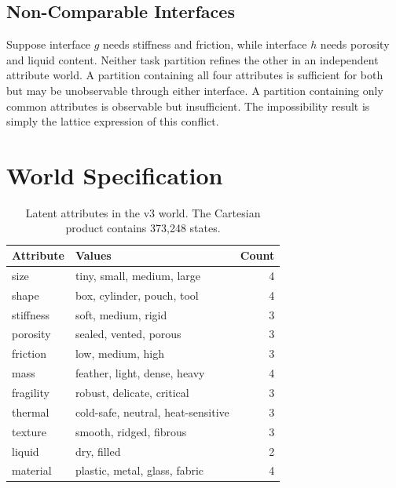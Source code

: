 \documentclass{article}
\begin{document}
\subsection{Non-Comparable Interfaces}

Suppose interface $g$ needs stiffness and friction, while interface $h$ needs porosity and liquid content.
Neither task partition refines the other in an independent attribute world.
A partition containing all four attributes is sufficient for both but may be unobservable through either interface.
A partition containing only common attributes is observable but insufficient.
The impossibility result is simply the lattice expression of this conflict.

\section{World Specification}

\begin{table}[h]
\centering
\caption{Latent attributes in the v3 world. The Cartesian product contains 373,248 states.}
\begin{tabular}{llr}
\toprule
Attribute & Values & Count \\
\midrule
size & tiny, small, medium, large & 4 \\
shape & box, cylinder, pouch, tool & 4 \\
stiffness & soft, medium, rigid & 3 \\
porosity & sealed, vented, porous & 3 \\
friction & low, medium, high & 3 \\
mass & feather, light, dense, heavy & 4 \\
fragility & robust, delicate, critical & 3 \\
thermal & cold-safe, neutral, heat-sensitive & 3 \\
texture & smooth, ridged, fibrous & 3 \\
liquid & dry, filled & 2 \\
material & plastic, metal, glass, fabric & 4 \\
\bottomrule
\end{tabular}
\end{table}
\end{document}
